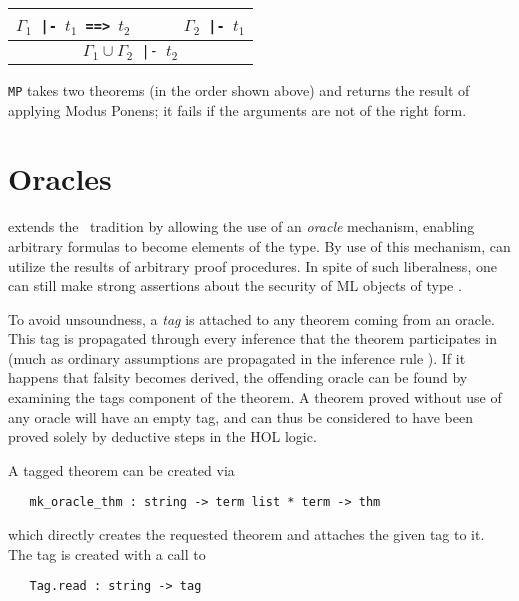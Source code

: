 \begin{center}
\begin{tabular}{c}
$\Gamma_1${\small\verb+ |- +}$t_1${\small\verb+ ==> +}$t_2$ {\small\verb+     +} $\Gamma_2${\small\verb+ |- +}$t_1$ \\
\hline
$\Gamma_1 \cup \Gamma_2${\small\verb+ |- +}$t_2$ \\
\end{tabular}
\end{center}

\noindent
{\small\verb+MP+} takes two theorems (in the order shown above) and returns
the result of applying Modus Ponens; it fails if the arguments are not of the
right form.

\section{Oracles}

\HOL{} extends the \LCF\ tradition by allowing the use of an
\emph{oracle} mechanism, enabling arbitrary formulas to become
elements of the  type. By use of this mechanism, \HOL{} can
utilize the results of arbitrary proof procedures. In spite of such
liberalness, one can still make strong assertions about the security
of ML objects of type .

To avoid unsoundness, a \emph{tag} is attached to any theorem coming
from an oracle. This tag is propagated through every inference that
the theorem participates in (much as ordinary assumptions are
propagated in the inference rule ). If it happens that falsity
becomes derived, the offending oracle can be found by examining the
tags component of the theorem. A theorem proved without use of any
oracle will have an empty tag, and can thus be considered to have been
proved solely by deductive steps in the HOL logic.

A tagged theorem can be created via

\begin{holboxed}
\begin{verbatim}
   mk_oracle_thm : string -> term list * term -> thm
\end{verbatim}
\end{holboxed}%
%
which directly creates the requested theorem and attaches the given
tag to it. The tag is created with a call to

\begin{holboxed}
\begin{verbatim}
   Tag.read : string -> tag
\end{verbatim}
\end{holboxed}

